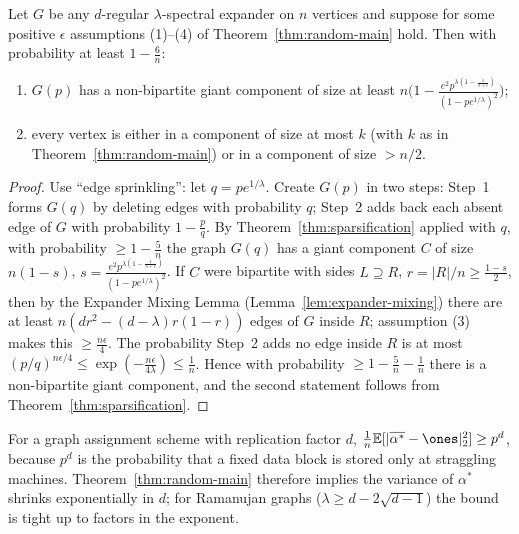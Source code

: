 \begin{corollary}
  \label{cor:nonbipartite-giant}
  Let $G$ be any $d$-regular $\lambda$-spectral expander on $n$ vertices and
  suppose for some positive $\epsilon$ assumptions (1)--(4) of
  Theorem~\ref{thm:random-main} hold. Then with probability at least
  $1 - \tfrac{6}{n}$:
  \begin{enumerate}
    \item $G(p)$ has a non-bipartite giant component of size at least
      $n\Big(1 - \tfrac{e^2 p^{\lambda(1-\frac{1}{3+\epsilon})}}{(1-pe^{1/\lambda})^2}\Big)$;
    \item every vertex is either in a component of size at most $k$ (with $k$ as
      in Theorem~\ref{thm:random-main}) or in a component of size $> n/2$.
  \end{enumerate}
\end{corollary}
\begin{proof}
  Use ``edge sprinkling'': let $q = pe^{1/\lambda}$. Create $G(p)$ in two steps:
  Step~1 forms $G(q)$ by deleting edges with probability $q$; Step~2 adds back
  each absent edge of $G$ with probability $1 - \tfrac{p}{q}$. By
  Theorem~\ref{thm:sparsification} applied with $q$, with probability
  $\ge 1 - \tfrac5n$ the graph $G(q)$ has a giant component $C$ of size
  $n(1-s)$, $s = \tfrac{e^2 p^{\lambda(1-\frac1{3+\epsilon})}}{(1-pe^{1/\lambda})^2}$.
  If $C$ were bipartite with sides $L \supseteq R$, $r = |R|/n \ge \tfrac{1-s}{2}$,
  then by the Expander Mixing Lemma (Lemma~\ref{lem:expander-mixing}) there are at
  least $n(dr^2 - (d-\lambda)r(1-r))$ edges of $G$ inside $R$; assumption (3)
  makes this $\ge \tfrac{n\epsilon}{4}$. The probability Step~2 adds no edge
  inside $R$ is at most $(p/q)^{n\epsilon/4} \le \exp(-\tfrac{n\epsilon}{4\lambda})
  \le \tfrac1n$. Hence with probability $\ge 1 - \tfrac5n - \tfrac1n$ there is a
  non-bipartite giant component, and the second statement follows from
  Theorem~\ref{thm:sparsification}.
\end{proof}

\begin{proposition}
  \label{prop:random-lower-remark}
  \notready
  For a graph assignment scheme with replication factor $d$,
  $\tfrac1n\E[|\overline{\alpha^*} - \ones|_2^2] \ge p^d$, because $p^d$ is the
  probability that a fixed data block is stored only at straggling machines.
  Theorem~\ref{thm:random-main} therefore implies the variance of $\alpha^*$
  shrinks exponentially in $d$; for Ramanujan graphs ($\lambda \ge d - 2\sqrt{d-1}$)
  the bound is tight up to factors in the exponent.
\end{proposition}

